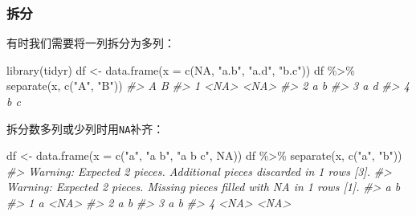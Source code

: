 \documentclass[
]{book}
\newenvironment{Shaded}{\begin{snugshade}}{\end{snugshade}}
\newcommand{\AttributeTok}[1]{\textcolor[rgb]{0.77,0.63,0.00}{#1}}
\newcommand{\CommentTok}[1]{\textcolor[rgb]{0.56,0.35,0.01}{\textit{#1}}}
\newcommand{\ConstantTok}[1]{\textcolor[rgb]{0.00,0.00,0.00}{#1}}
\newcommand{\FunctionTok}[1]{\textcolor[rgb]{0.00,0.00,0.00}{#1}}
\newcommand{\NormalTok}[1]{#1}
\newcommand{\OtherTok}[1]{\textcolor[rgb]{0.56,0.35,0.01}{#1}}
\newcommand{\SpecialCharTok}[1]{\textcolor[rgb]{0.00,0.00,0.00}{#1}}
\newcommand{\StringTok}[1]{\textcolor[rgb]{0.31,0.60,0.02}{#1}}
\begin{document}
\hypertarget{ux62c6ux5206}{%
\subsubsection{拆分}\label{ux62c6ux5206}}

有时我们需要将一列拆分为多列：

\begin{Shaded}
\begin{Highlighting}[]
\FunctionTok{library}\NormalTok{(tidyr)}
\NormalTok{df }\OtherTok{\textless{}{-}} \FunctionTok{data.frame}\NormalTok{(}\AttributeTok{x =} \FunctionTok{c}\NormalTok{(}\ConstantTok{NA}\NormalTok{, }\StringTok{"a.b"}\NormalTok{, }\StringTok{"a.d"}\NormalTok{, }\StringTok{"b.c"}\NormalTok{))}
\NormalTok{df }\SpecialCharTok{\%\textgreater{}\%} \FunctionTok{separate}\NormalTok{(x, }\FunctionTok{c}\NormalTok{(}\StringTok{"A"}\NormalTok{, }\StringTok{"B"}\NormalTok{))}
\CommentTok{\#\textgreater{}      A    B}
\CommentTok{\#\textgreater{} 1 \textless{}NA\textgreater{} \textless{}NA\textgreater{}}
\CommentTok{\#\textgreater{} 2    a    b}
\CommentTok{\#\textgreater{} 3    a    d}
\CommentTok{\#\textgreater{} 4    b    c}
\end{Highlighting}
\end{Shaded}

拆分数多列或少列时用\texttt{NA}补齐：

\begin{Shaded}
\begin{Highlighting}[]
\NormalTok{df }\OtherTok{\textless{}{-}} \FunctionTok{data.frame}\NormalTok{(}\AttributeTok{x =} \FunctionTok{c}\NormalTok{(}\StringTok{"a"}\NormalTok{, }\StringTok{"a b"}\NormalTok{, }\StringTok{"a b c"}\NormalTok{, }\ConstantTok{NA}\NormalTok{))}
\NormalTok{df }\SpecialCharTok{\%\textgreater{}\%} \FunctionTok{separate}\NormalTok{(x, }\FunctionTok{c}\NormalTok{(}\StringTok{"a"}\NormalTok{, }\StringTok{"b"}\NormalTok{))}
\CommentTok{\#\textgreater{} Warning: Expected 2 pieces. Additional pieces discarded in 1 rows [3].}
\CommentTok{\#\textgreater{} Warning: Expected 2 pieces. Missing pieces filled with \textasciigrave{}NA\textasciigrave{} in 1 rows [1].}
\CommentTok{\#\textgreater{}      a    b}
\CommentTok{\#\textgreater{} 1    a \textless{}NA\textgreater{}}
\CommentTok{\#\textgreater{} 2    a    b}
\CommentTok{\#\textgreater{} 3    a    b}
\CommentTok{\#\textgreater{} 4 \textless{}NA\textgreater{} \textless{}NA\textgreater{}}
\end{Highlighting}
\end{Shaded}
\end{document}
